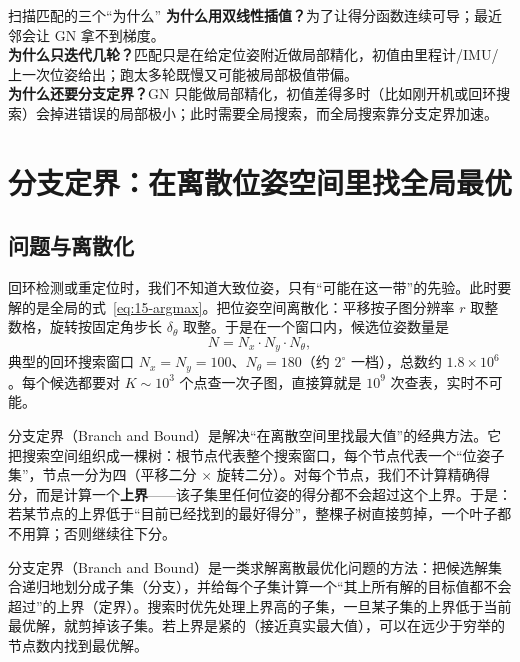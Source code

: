 \begin{keybox}{扫描匹配的三个``为什么''}
\textbf{为什么用双线性插值？}为了让得分函数连续可导；最近邻会让 GN 拿不到梯度。\\
\textbf{为什么只迭代几轮？}匹配只是在给定位姿附近做局部精化，初值由里程计/IMU/上一次位姿给出；跑太多轮既慢又可能被局部极值带偏。\\
\textbf{为什么还要分支定界？}GN 只能做局部精化，初值差得多时（比如刚开机或回环搜索）会掉进错误的局部极小；此时需要全局搜索，而全局搜索靠分支定界加速。
\end{keybox}

\section{分支定界：在离散位姿空间里找全局最优}\label{sec:15-bnb}

\subsection{问题与离散化}

回环检测或重定位时，我们不知道大致位姿，只有``可能在这一带''的先验。此时要解的是全局的式~\eqref{eq:15-argmax}。把位姿空间离散化：平移按子图分辨率 $r$ 取整数格，旋转按固定角步长 $\delta_\theta$ 取整。于是在一个窗口内，候选位姿数量是
\begin{equation}
N=N_x\cdot N_y\cdot N_\theta ,
\end{equation}
典型的回环搜索窗口 $N_x=N_y=100$、$N_\theta=180$（约 $2^{\circ}$ 一档），总数约 $1.8\times10^{6}$。每个候选都要对 $K\sim10^{3}$ 个点查一次子图，直接算就是 $10^{9}$ 次查表，实时不可能。

分支定界（Branch and Bound）是解决``在离散空间里找最大值''的经典方法。它把搜索空间组织成一棵树：根节点代表整个搜索窗口，每个节点代表一个``位姿子集''，节点一分为四（平移二分 $\times$ 旋转二分）。对每个节点，我们不计算精确得分，而是计算一个\textbf{上界}——该子集里任何位姿的得分都不会超过这个上界。于是：若某节点的上界低于``目前已经找到的最好得分''，整棵子树直接剪掉，一个叶子都不用算；否则继续往下分。

\begin{definition}[分支定界]
分支定界（Branch and Bound）是一类求解离散最优化问题的方法：把候选解集合递归地划分成子集（分支），并给每个子集计算一个``其上所有解的目标值都不会超过''的上界（定界）。搜索时优先处理上界高的子集，一旦某子集的上界低于当前最优解，就剪掉该子集。若上界是紧的（接近真实最大值），可以在远少于穷举的节点数内找到最优解。
\end{definition}

